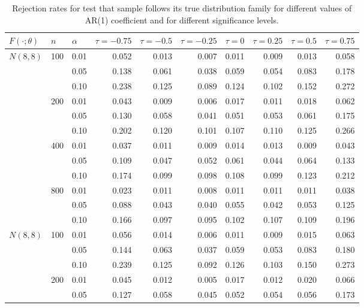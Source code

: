 \documentclass[12pt, titlepage, letterpaper]{article}
\begin{document}
\begin{table}[ht]
\centering
\caption{Rejection rates for test that sample follows its true
                    distribution family for
                   different values of AR(1) coefficient and for different 
                   significance levels.} 
\label{table:size}
\begin{tabular}{lllrrrrrrr}
  \toprule
$F(\cdot; \theta)$ & $n$ & $\alpha$ & $\tau = -0.75$ & $\tau = -0.5$ & $\tau = -0.25$ 
& $\tau = 0$ & $\tau = 0.25$ & $\tau = 0.5$ & $\tau = 0.75$ \\ 
  \midrule
\multirow{12}{3em}{$N(8,8)$} & \multirow{3}{2em}{100} & 0.01 & 0.052 & 0.013
& 0.007 & 0.011 & 0.009 & 0.013 & 0.058 \\ 
& & 0.05 & 0.138 & 0.061 & 0.038 & 0.059 & 0.054 & 0.083 & 0.178 \\ 
& & 0.10 & 0.238 & 0.125 & 0.089 & 0.124 & 0.102 & 0.152 & 0.272 \\ 
& \multirow{3}{2em}{200} & 0.01 & 0.043 & 0.009 & 0.006 & 0.017 & 0.011 & 0.018 & 0.062 \\ 
& & 0.05 & 0.130 & 0.058 & 0.041 & 0.051 & 0.053 & 0.061 & 0.175 \\ 
& & 0.10 & 0.202 & 0.120 & 0.101 & 0.107 & 0.110 & 0.125 & 0.266 \\ 
& \multirow{3}{2em}{400} & 0.01 & 0.037 & 0.011 & 0.009 & 0.014 & 0.013 & 0.009 & 0.043 \\ 
& & 0.05 & 0.109 & 0.047 & 0.052 & 0.061 & 0.044 & 0.064 & 0.133 \\ 
& & 0.10 & 0.174 & 0.099 & 0.098 & 0.108 & 0.099 & 0.123 & 0.212 \\ 
& \multirow{3}{2em}{800} & 0.01 & 0.023 & 0.011 & 0.008 & 0.011 & 0.011 & 0.011 & 0.038 \\ 
& & 0.05 & 0.088 & 0.043 & 0.040 & 0.055 & 0.042 & 0.053 & 0.125 \\ 
& & 0.10 & 0.166 & 0.097 & 0.095 & 0.102 & 0.107 & 0.109 & 0.196 \\ 
\multirow{12}{3em}{$N(8,8)$} & \multirow{3}{2em}{100} & 0.01 & 0.056 & 0.014 & 0.006 & 0.011 & 0.009 & 0.015 & 0.063 \\ 
  & & 0.05 & 0.144 & 0.063 & 0.037 & 0.059 & 0.053 & 0.083 & 0.180 \\ 
  & & 0.10 & 0.239 & 0.125 & 0.092 & 0.126 & 0.103 & 0.150 & 0.273 \\ 
  & \multirow{3}{2em}{200} & 0.01 & 0.045 & 0.012 & 0.005 & 0.017 & 0.012 & 0.020 & 0.066 \\ 
  & & 0.05 & 0.127 & 0.058 & 0.045 & 0.052 & 0.054 & 0.056 & 0.173 \\ 

\end{tabular}
\end{table}
\end{document}
